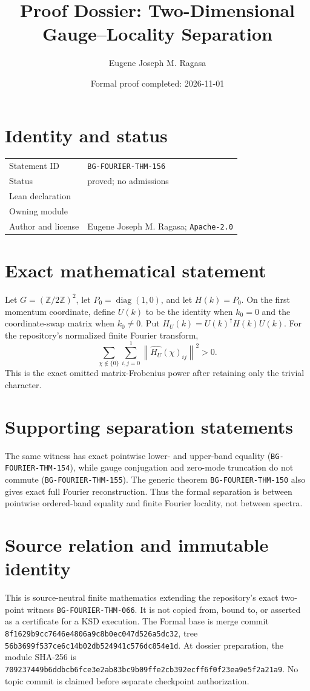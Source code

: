 \documentclass[10pt]{article}
\title{Proof Dossier: Two-Dimensional Gauge--Locality Separation}
\author{Eugene Joseph M. Ragasa}
\date{Formal proof completed: 2026-11-01}
\begin{document}
\raggedright
\maketitle

\section{Identity and status}
\begin{tabularx}{\textwidth}{@{}lY@{}}
\toprule
Statement ID & \texttt{BG-FOURIER-THM-156} \\
Status & proved; no admissions \\
Lean declaration &  \\
Owning module &  \\
Author and license & Eugene Joseph M. Ragasa; \texttt{Apache-2.0} \\
\bottomrule
\end{tabularx}

\section{Exact mathematical statement}
Let $G=(\mathbb Z/2\mathbb Z)^2$, let $P_0=\operatorname{diag}(1,0)$, and let
$H(k)=P_0$.  On the first momentum coordinate, define $U(k)$ to be the identity when
$k_0=0$ and the coordinate-swap matrix when $k_0\ne0$.  Put
$H_U(k)=U(k)^\dagger H(k)U(k)$.  For the repository's normalized finite Fourier transform,
\[
 \sum_{\chi\notin\{0\}}\sum_{i,j=0}^{1}
   \left\lVert\widehat{H_U}(\chi)_{ij}\right\rVert^2>0.
\]
This is the exact omitted matrix-Frobenius power after retaining only the trivial character.

\section{Supporting separation statements}
The same witness has exact pointwise lower- and upper-band equality
(\texttt{BG-FOURIER-THM-154}), while gauge conjugation and zero-mode truncation do not commute
(\texttt{BG-FOURIER-THM-155}).  The generic theorem
\texttt{BG-FOURIER-THM-150} also gives exact full Fourier reconstruction.  Thus the formal
separation is between pointwise ordered-band equality and finite Fourier locality, not between
spectra.

\section{Source relation and immutable identity}
This is source-neutral finite mathematics extending the repository's exact two-point witness
\texttt{BG-FOURIER-THM-066}.  It is not copied from, bound to, or asserted as a certificate for a
KSD execution.  The Formal base is merge commit
\texttt{8f1629b9cc7646e4806a9c8b0ec047d526a5dc32}, tree
\texttt{56b3699f537ce6c14b02db524941c576dc854e1d}.  At dossier preparation, the module SHA-256 is
\texttt{709237449b6ddbcb6fce3e2ab83bc9b09ffe2cb392ecff6f0f23ea9e5f2a21a9}.
No topic commit is claimed before separate checkpoint authorization.
\end{document}
